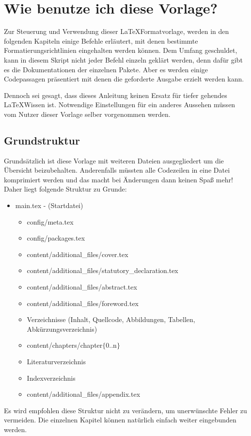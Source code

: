 \chapter{Wie benutze ich diese Vorlage?}
	\label{chap:wiebenutzeichdiesevorlage}
	
	
	Zur Steuerung und Verwendung dieser \LaTeX Formatvorlage, werden in den folgenden Kapiteln einige Befehle erläutert, mit denen bestimmte Formatierungsrichtlinien eingehalten
	werden können. Dem Umfang geschuldet, kann in diesem Skript nicht jeder Befehl einzeln geklärt werden, denn dafür gibt es die Dokumentationen der einzelnen 
	Pakete. Aber es werden einige Codepassagen präsentiert mit denen die geforderte Ausgabe erzielt werden kann.
	
	Dennoch sei gesagt, dass dieses Anleitung keinen Ersatz für tiefer gehendes \LaTeX Wissen ist. Notwendige Einstellungen für ein anderes Aussehen müssen vom Nutzer dieser Vorlage selber vorgenommen werden.
	
	\section{Grundstruktur}
		\label{sec:grundstruktur}
		Grundsätzlich ist diese Vorlage mit weiteren Dateien ausgegliedert um die Übersicht beizubehalten.  Anderenfalls müssten alle Codezeilen in eine Datei komprimiert werden und das macht bei Änderungen dann keinen Spaß mehr!
		Daher liegt folgende Struktur zu Grunde:
		\begin{itemize}[noitemsep]
			\item main.tex - (Startdatei)
			\begin{itemize}[noitemsep]
				\item config/meta.tex
				\item config/packages.tex
				\item content/additional\_files/cover.tex
				\item content/additional\_files/statutory\_declaration.tex
				\item content/additional\_files/abstract.tex
				\item content/additional\_files/foreword.tex
				\item Verzeichnisse (Inhalt, Quellcode, Abbildungen, Tabellen, Abkürzungsverzeichnis)
				\item content/chapters/chapter$\{$0..n$\}$
				\item Literaturverzeichnis
				\item Indexverzeichnis
				\item content/additional\_files/appendix.tex
			\end{itemize}
		\end{itemize}
		Es wird empfohlen diese Struktur nicht zu verändern, um unerwünschte Fehler zu vermeiden. Die einzelnen Kapitel können natürlich einfach weiter eingebunden werden.	
	
